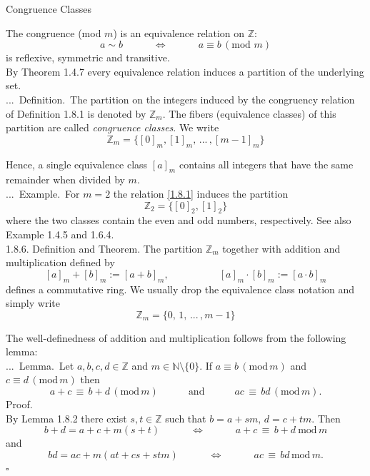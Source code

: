 \documentclass[smaller,hyperref={CJKbookmarks=true}]{beamer}
\newcommand{\N}{\mathbb{N}} \newcommand{\Z}{\mathbb{Z}} \newcommand{\Q}{\mathbb{Q}}
\newenvironment{PROOF}{{\noindent\!\sf\alert{Proof.}}\\}{\hfill$\square$\\}
\newcounter{zhuo}[subsection]
\renewcommand{\thezhuo}{\thesection.\thesubsection.\arabic{zhuo}}
\newenvironment{DEFINITION}{\stepcounter{zhuo}\alert{\thezhuo.~Definition.\,}}{}
\newenvironment{EXAMPLE}{\stepcounter{zhuo}\alert{\!\thezhuo.~Example.\,}}{}
\newenvironment{LEMMA}{\stepcounter{zhuo}\alert{\thezhuo.~Lemma.\,}}{}
\begin{document}
\begin{frame}{Congruence Classes}
\begin{spacing}{1.1}
The congruence (mod $m$) is an equivalence relation on $\Z$:
\setcounter{equation}{0}
\begin{equation}\label{1.8.1}
a\sim b\qquad\quad\Leftrightarrow\qquad\quad
a\equiv b\,(\text{mod}\,\,m)
\end{equation}
is reflexive, symmetric and transitive.\\[4pt]
By Theorem 1.4.7 every equivalence relation induces a partition of the underlying set.\\[4pt]
\begin{DEFINITION}
The partition on the integers induced by the congruency
relation of Definition 1.8.1 is denoted by $\Z_m$. The fibers (equivalence classes) of this partition are called \emph{congruence classes}. We write
\[\Z_m=\{[0]_m,[1]_m,\,...\,,[m-1]_m\}\]
\end{DEFINITION}
\end{spacing}
\newpage
\begin{spacing}{1}
Hence, a single equivalence class $[a]_m$ contains all integers that have the same remainder when divided by $m$.\\[4pt]
\begin{EXAMPLE}
For $m=2$ the relation \eqref{1.8.1} induces the partition
\[\Z_2=\{[0]_2,[1]_2\}\]
where the two classes contain the even and odd numbers, respectively. See also Example 1.4.5 and 1.6.4.\\[4pt]
\end{EXAMPLE}
\alert{1.8.6. Definition and Theorem.} The partition $\Z_m$ together with addition and multiplication defined by
\[[a]_m+[b]_m:=[a+b]_m,\qquad\qquad\quad
[a]_m\cdot[b]_m:=[a\cdot b]_m\]
defines a commutative ring. We usually drop the equivalence class
notation and simply write
\[\Z_m=\{0,\,1,\,...\,,m-1\}\]
\end{spacing}
\newpage
\begin{spacing}{1.1}
The well-definedness of addition and multiplication follows from the following lemma:\\[4pt]
\begin{LEMMA}
Let $a,b,c,d\in\Z$ and $m\in\N\setminus\{0\}$. If $a\equiv b\,(\text{mod}\,m)$ and $c\equiv d\,(\text{mod}\,m)$ then
\[a+c\,\equiv\,b+d\,(\text{mod}\,m)\qquad\quad
\text{and}\qquad\quad ac\,\equiv\,bd\,(\text{mod}\,m).\]
\end{LEMMA}
\begin{PROOF}
By Lemma 1.8.2 there exist $s,t\in\Z$ such that $b=a+sm,\,d=c+tm$. Then
\[b+d=a+c+m(s+t)\qquad\quad\Leftrightarrow
\qquad\quad a+c\,\equiv\,b+d~\text{mod}\,m\]
and
\[bd=ac+m(at+cs+stm)\qquad\quad
\Leftrightarrow\qquad\quad
ac\,\equiv\,bd\,\text{mod}\,m.\]
\end{PROOF}
\end{spacing}
\end{frame}
\end{document}
